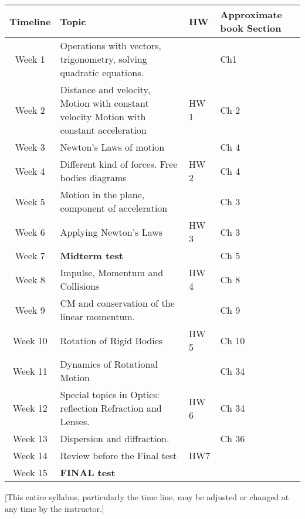 \documentclass[12pt]{article}
\begin{document}
\raggedright
\begin{center}

 \begin{tabular}{|c |l| l| l|} 


 \hline
Timeline & Topic & HW &\multicolumn{1}{p{3cm}|}{ Approximate book Section} \\ [0.5ex] 
 \hline\hline
 Week 1 &\multicolumn{1}{p{10cm}|}{ Operations with vectors, trigonometry, solving quadratic
equations.} &  &Ch1  \\ 
 \hline
  Week 2 & \multicolumn{1}{p{10cm}|}{Distance and velocity, Motion with constant velocity
Motion with constant acceleration}   &HW 1 &Ch 2  \\
 \hline
 Week 3 &Newton's Laws of motion & & Ch 4 \\
 \hline
 Week 4 & \multicolumn{1}{p{10cm}|}{Different kind of forces. Free bodies diagrams}  & HW 2 & Ch 4 \\
 \hline

 Week 5 & \multicolumn{1}{p{10cm}|}{ Motion in the plane, component of acceleration } & & Ch 3  \\
\hline

 Week 6 & \multicolumn{1}{p{10cm}|}{ Applying Newton's Laws } &  HW 3& Ch 3  \\
\hline

 Week 7 &\multicolumn{1}{p{10cm}|}{ \textbf{Midterm test} } 
 &  & Ch 5 \\ 

 \hline
 Week 8 &\multicolumn{1}{p{10cm}|}{ Impulse, Momentum and Collisions }&  HW 4 &Ch 8  \\ 
 \hline
 Week 9 & \multicolumn{1}{p{10cm}|}{CM and conservation of the linear momentum. }
 & & Ch 9 \\ 
 \hline
 Week 10 &\multicolumn{1}{p{10cm}|}{ Rotation of Rigid Bodies} & HW 5 &Ch 10  \\ 
 \hline
 Week 11 &\multicolumn{1}{p{10cm}|}{Dynamics of Rotational Motion }&  & Ch 34 \\ 
 \hline
 Week 12 &\multicolumn{1}{p{10cm}|}{Special topics in Optics: reflection
Refraction and Lenses.}  & HW 6 & Ch 34 \\ 
 \hline
 Week 13 & \multicolumn{1}{p{10cm}|}{ Dispersion and diffraction.} &  & Ch 36 \\ 
 \hline
 Week 14 &\multicolumn{1}{p{10cm}|}{Review before the Final test } &HW7   &  \\ 
 \hline

 Week 15 & \textbf{FINAL test}&  &  \\ 
 \hline
\end{tabular}

\end{center}


[This entire syllabus, particularly the time line, may be adjusted or changed at any time by the instructor.]
\end{document}
